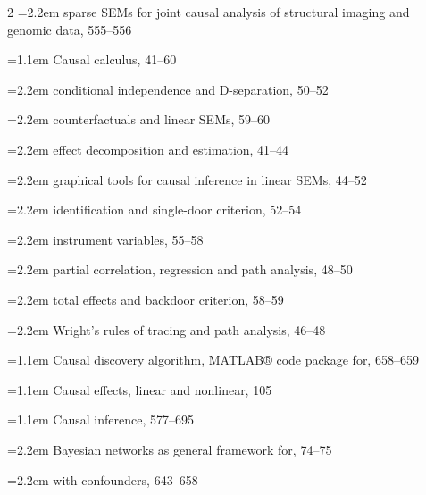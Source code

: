 \begin{multicols}{2}
\noindent\hangindent=2.2em \hspace*{1.1em}sparse SEMs for joint causal analysis of structural imaging and genomic data, 555--556\par
\noindent\hangindent=1.1em Causal calculus, 41--60\par
\noindent\hangindent=2.2em \hspace*{1.1em}conditional independence and D-separation, 50--52\par
\noindent\hangindent=2.2em \hspace*{1.1em}counterfactuals and linear SEMs, 59--60\par
\noindent\hangindent=2.2em \hspace*{1.1em}effect decomposition and estimation, 41--44\par
\noindent\hangindent=2.2em \hspace*{1.1em}graphical tools for causal inference in linear SEMs, 44--52\par
\noindent\hangindent=2.2em \hspace*{1.1em}identification and single-door criterion, 52--54\par
\noindent\hangindent=2.2em \hspace*{1.1em}instrument variables, 55--58\par
\noindent\hangindent=2.2em \hspace*{1.1em}partial correlation, regression and path analysis, 48--50\par
\noindent\hangindent=2.2em \hspace*{1.1em}total effects and backdoor criterion, 58--59\par
\noindent\hangindent=2.2em \hspace*{1.1em}Wright's rules of tracing and path analysis, 46--48\par
\noindent\hangindent=1.1em Causal discovery algorithm, MATLAB® code package for, 658--659\par
\noindent\hangindent=1.1em Causal effects, linear and nonlinear, 105\par
\noindent\hangindent=1.1em Causal inference, 577--695\par
\noindent\hangindent=2.2em \hspace*{1.1em}Bayesian networks as general framework for, 74--75\par
\noindent\hangindent=2.2em \hspace*{1.1em}with confounders, 643--658\par

\end{multicols}
